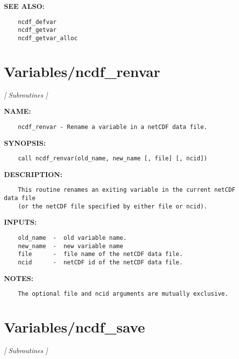 \textbf{SEE ALSO:}\hspace{0.08in}\begin{Verbatim}
    ncdf_defvar
    ncdf_getvar
    ncdf_getvar_alloc
\end{Verbatim}
\section{Variables/ncdf\_renvar}
\textsl{[ Subroutines ]}

\label{ch:robo118}
\label{ch:Variables_ncdf_renvar}
\textbf{NAME:}\hspace{0.08in}\begin{Verbatim}
    ncdf_renvar - Rename a variable in a netCDF data file.
\end{Verbatim}
\textbf{SYNOPSIS:}\hspace{0.08in}\begin{Verbatim}
    call ncdf_renvar(old_name, new_name [, file] [, ncid])
\end{Verbatim}
\textbf{DESCRIPTION:}\hspace{0.08in}\begin{Verbatim}
    This routine renames an exiting variable in the current netCDF data file
    (or the netCDF file specified by either file or ncid).
\end{Verbatim}
\textbf{INPUTS:}\hspace{0.08in}\begin{Verbatim}
    old_name  -  old variable name.
    new_name  -  new variable name
    file      -  file name of the netCDF data file.
    ncid      -  netCDF id of the netCDF data file.
\end{Verbatim}
\textbf{NOTES:}\hspace{0.08in}\begin{Verbatim}
    The optional file and ncid arguments are mutually exclusive.
\end{Verbatim}
\section{Variables/ncdf\_save}
\textsl{[ Subroutines ]}

